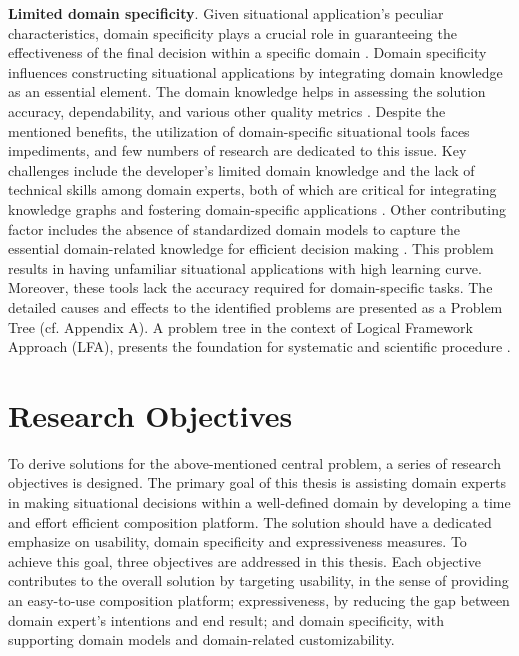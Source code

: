 \textbf{Limited domain specificity}. Given situational application's peculiar characteristics, domain
specificity plays a crucial role in guaranteeing the effectiveness of
the final decision within a specific domain \autocite{Noran2018}.
Domain specificity influences constructing situational applications by
integrating domain knowledge as an essential element. The domain
knowledge helps in assessing the solution accuracy, dependability, and
various other quality metrics \autocite{Bryant2010}. Despite the
mentioned benefits, the utilization of domain-specific situational tools
faces impediments, and few numbers of research are dedicated to this
issue. Key challenges include the developer's limited
domain knowledge and the lack of technical skills among domain experts,
both of which are critical for integrating knowledge graphs and
fostering domain-specific applications \autocite{Santos2019}
\autocite{Casati2012}. Other contributing factor includes the
absence of standardized domain models to capture the essential
domain-related knowledge for efficient decision making \autocite{Ponce2022}.
This problem results in having unfamiliar situational applications with
high learning curve. Moreover, these tools lack the accuracy required
for domain-specific tasks. The detailed causes and effects to the
identified problems are presented as a Problem Tree (cf. Appendix A). A
problem tree in the context of Logical Framework Approach (LFA),
presents the foundation for systematic and scientific procedure \autocite{EUIntegrationOffice.2011}.

\vspace{-15pt}
\hypertarget{sec:objectives}{%
\section{Research Objectives}\label{sec:objectives}}
\vspace{15pt}

To derive solutions for the above-mentioned central problem, a series of research objectives is designed. The primary goal of this thesis is assisting domain experts in making situational decisions within a well-defined domain by developing a time and effort efficient composition platform. The solution should have a dedicated emphasize on usability, domain specificity and expressiveness measures. To achieve this goal, three objectives are addressed in this thesis. Each objective contributes to the overall solution by targeting usability, in the sense of providing an easy-to-use composition platform; expressiveness, by reducing the gap between domain expert’s intentions and end result; and domain specificity, with supporting domain models and domain-related customizability.

